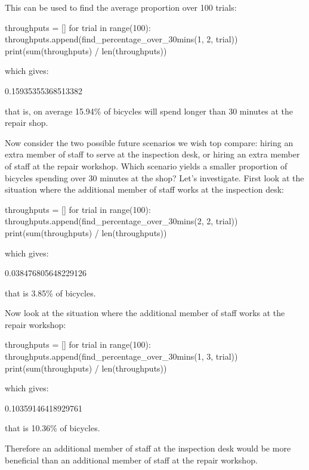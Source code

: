 This can be used to find the average proportion over 100 trials:

\begin{pyin}
throughputs = []
for trial in range(100):
    throughputs.append(find_percentage_over_30mins(1, 2, trial))
print(sum(throughputs) / len(throughputs))
\end{pyin}

which gives:

\begin{pyout}
0.15935355368513382
\end{pyout}

that is, on average 15.94\% of bicycles will spend longer than 30 minutes at the
repair shop.

Now consider the two possible future scenarios we wish top compare: hiring an
extra member of staff to serve at the inspection desk, or hiring an extra member
of staff at the repair workshop. Which scenario yields a smaller proportion of
bicycles spending over 30 minutes at the shop? Let's investigate. First look at
the situation where the additional member of staff works at the inspection desk:

\begin{pyin}
throughputs = []
for trial in range(100):
    throughputs.append(find_percentage_over_30mins(2, 2, trial))
print(sum(throughputs) / len(throughputs))
\end{pyin}

which gives:

\begin{pyout}
0.038476805648229126
\end{pyout}

that is 3.85\% of bicycles.

Now look at the situation where the additional member of staff works at the
repair workshop:

\begin{pyin}
throughputs = []
for trial in range(100):
    throughputs.append(find_percentage_over_30mins(1, 3, trial))
print(sum(throughputs) / len(throughputs))
\end{pyin}

which gives:

\begin{pyout}
0.10359146418929761
\end{pyout}

that is 10.36\% of bicycles.

Therefore an additional member of staff at the inspection desk would be more
beneficial than an additional member of staff at the repair workshop.


